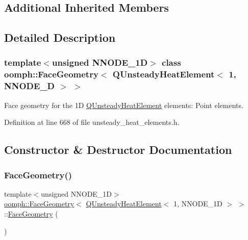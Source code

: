\subsection*{Additional Inherited Members}


\subsection{Detailed Description}
\subsubsection*{template$<$unsigned N\+N\+O\+D\+E\+\_\+1D$>$\newline
class oomph\+::\+Face\+Geometry$<$ Q\+Unsteady\+Heat\+Element$<$ 1, N\+N\+O\+D\+E\+\_\+D $>$ $>$}

Face geometry for the 1D \hyperlink{classoomph_1_1QUnsteadyHeatElement}{Q\+Unsteady\+Heat\+Element} elements\+: Point elements. 

Definition at line 668 of file unsteady\+\_\+heat\+\_\+elements.\+h.



\subsection{Constructor \& Destructor Documentation}
\mbox{\label{classoomph_1_1FaceGeometry_3_01QUnsteadyHeatElement_3_011_00_01NNODE__1D_01_4_01_4_a8289eb012fff70c662ee87d1576451b6}} 
\subsubsection{\texorpdfstring{Face\+Geometry()}{FaceGeometry()}}
{\footnotesize\ttfamily template$<$unsigned N\+N\+O\+D\+E\+\_\+1D$>$ \\
\hyperlink{classoomph_1_1FaceGeometry}{oomph\+::\+Face\+Geometry}$<$ \hyperlink{classoomph_1_1QUnsteadyHeatElement}{Q\+Unsteady\+Heat\+Element}$<$ 1, N\+N\+O\+D\+E\+\_\+1D $>$ $>$\+::\hyperlink{classoomph_1_1FaceGeometry}{Face\+Geometry} (\begin{DoxyParamCaption}{ }\end{DoxyParamCaption})\hspace{0.3cm}{\ttfamily [inline]}}



